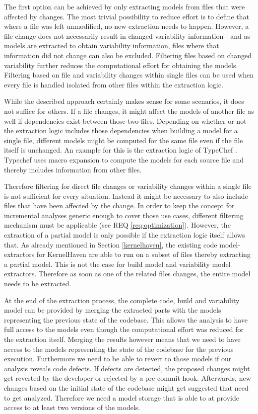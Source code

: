 \documentclass[a4paper]{article}
\begin{document}
The first option can be achieved by only extracting models from files that were affected by changes. The most trivial possibility to reduce effort is to define that where a file was left unmodified, no new extraction needs to happen. 
However, a file change does not necessarily result in changed variability information - and as models are extracted to obtain variability information, files where that information did not change can also be excluded. Filtering files based on changed variability further reduces the computational effort for obtaining the models. Filtering based on file and variability changes within single files can be used when every file is handled isolated from other files within the extraction logic.

While the described approach certainly makes sense for some scenarios, it does not suffice for others. If a file changes, it might affect the models of another file as well if dependencies exist between those two files. Depending on whether or not the extraction logic includes those dependencies when building a model for a single file, different models might be computed for the same file even if the file itself is unchanged. An example for this is the extraction logic of TypeChef \cite{Kenner:2010:TTT:1868688.1868693}. Typechef uses macro expansion to compute the models for each source file and thereby includes information from other files. 

Therefore filtering for direct file changes or variability changes within a single file is not sufficient for every situation. Instead it might be necessary to also include files that have been affected by the change. In order to keep the concept for incremental analyses generic enough to cover those use cases, different filtering mechanism must be applicable (see REQ \ref{req:optimization}). However, the extraction of a partial model is only possible if the extraction logic itself allows that. As already mentioned in Section \ref{kernelhaven}, the existing code model-extractors for KernelHaven  are able to run on a subset of files thereby extracting a partial model.  This is not the case for build model and variability model extractors. Therefore as soon as one of the related files changes, the entire model needs to be extracted.  

At the end of the extraction process, the complete code, build and variability model can be provided by merging the extracted parts with the models representing the previous state of the codebase. This allows the analysis to have full access to the models even though the computational effort was reduced for the extraction itself. Merging the results however means that we need to have access to the models representing the state of the codebase for the previous execution. Furthermore we need to be able to revert to those models if our analysis reveals code defects. If defects are detected, the proposed changes might get reverted by the developer or rejected by a pre-commit-hook. Afterwards, new changes based on the initial state of the codebase might get suggested that need to get analyzed. Therefore we need a model storage that is able to at provide access to at least two versions of the models.
\end{document}
